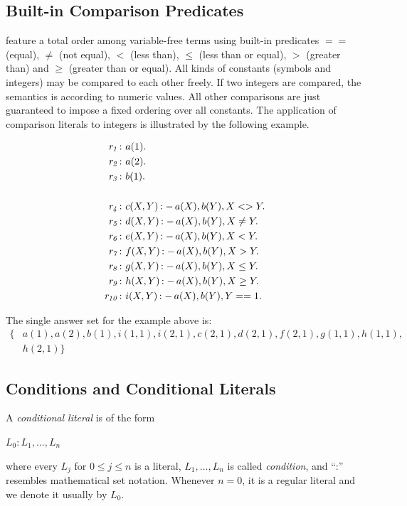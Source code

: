 \documentclass[a4paper, titlepage]{article}
\DeclareMathOperator{\leftimpl}{:-}
\newcommand{\row}[1]{%
  \ensuremath{\it \color{black} #1 \color{black}}%
}
\begin{document}
\subsection{Built-in Comparison Predicates}
\dlvhex{} feature a total order among variable-free terms 
using built-in predicates $==$ (equal), $\neq$ (not equal), 
$<$ (less than), $\leq$ (less than or equal), $>$ (greater 
than) and $\geq$ (greater than or equal). All kinds of 
constants (symbols and integers) may be compared to 
each other freely. If two integers are compared, the 
semantics is according to numeric values. All other 
comparisons are just guaranteed to impose a fixed ordering 
over all constants. The application of comparison literals 
to integers is illustrated by the following example.
\begin{exmp}
\begin{align*}
\row{r_1}\colon& a(1). \\
\row{r_2}\colon& a(2). \\
\row{r_3}\colon& b(1). \\
\\
\row{r_4}\colon& c(X,Y) \leftimpl a(X), b(Y), X <> Y. \\
\row{r_5}\colon& d(X,Y) \leftimpl a(X), b(Y), X \neq Y. \\
\row{r_6}\colon& e(X,Y) \leftimpl a(X), b(Y), X < Y. \\
\row{r_7}\colon& f(X,Y) \leftimpl a(X), b(Y), X > Y. \\
\row{r_8}\colon& g(X,Y) \leftimpl a(X), b(Y), X \leq Y. \\
\row{r_9}\colon& h(X,Y) \leftimpl a(X), b(Y), X \geq Y. \\
\row{r_{10}}\colon& i(X,Y) \leftimpl a(X), b(Y), Y == 1. 
\end{align*}
\end{exmp}
The single answer set for the example above is:
\begin{align*}
\{ & \mathit{a(1),a(2),b(1),i(1,1),i(2,1),c(2,1),d(2,1),f(2,1),g(1,1),h(1,1)},\\
   & \mathit{h(2,1)}\}
\end{align*}

\subsection{Conditions and Conditional Literals}
\label{conditions}
A \emph{conditional literal} is of the form \\ 
\centerline{$L_0:L_1,\dots,L_n$} where every $\mathit{L_j}$ 
for $0 \leq j \leq n$ is a literal, $L_1,\dots,L_n$ is 
called \emph{condition}, and \enquote{:} resembles 
mathematical set notation. Whenever $\mathit{n = 0}$, it is 
a regular literal and we denote it usually by $L_0$.
\end{document}

